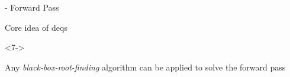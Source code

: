 \documentclass[8pt, t,
aspectratio=169,%
]{beamer}
\begin{document}
\begin{frame}{ - Forward Pass}
\begin{onlyenv}
\begin{block}{Core idea of \glspl{deq}}
\begin{itemize}
\begin{onlyenv}
                \end{onlyenv}
                \begin{onlyenv}<7->
                \item Any \emph{black-box-root-finding} algorithm can be applied to solve the forward pass
                \end{onlyenv}
                
            \end{itemize}
        \end{block}
    \end{onlyenv}
    
\end{frame}
\end{document}
